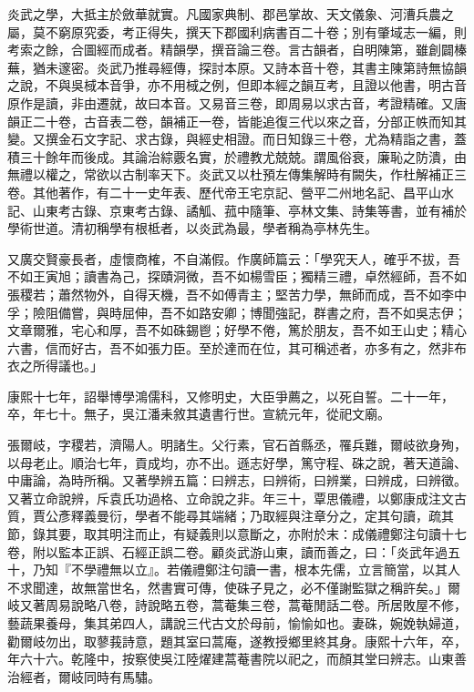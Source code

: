 \begin{pinyinscope}
炎武之學，大抵主於斂華就實。凡國家典制、郡邑掌故、天文儀象、河漕兵農之屬，莫不窮原究委，考正得失，撰天下郡國利病書百二十卷；別有肇域志一編，則考索之餘，合圖經而成者。精韻學，撰音論三卷。言古韻者，自明陳第，雖創闢榛蕪，猶未邃密。炎武乃推尋經傳，探討本原。又詩本音十卷，其書主陳第詩無協韻之說，不與吳棫本音爭，亦不用棫之例，但即本經之韻互考，且證以他書，明古音原作是讀，非由遷就，故曰本音。又易音三卷，即周易以求古音，考證精確。又唐韻正二十卷，古音表二卷，韻補正一卷，皆能追復三代以來之音，分部正帙而知其變。又撰金石文字記、求古錄，與經史相證。而日知錄三十卷，尤為精詣之書，蓋積三十餘年而後成。其論治綜覈名實，於禮教尤兢兢。謂風俗衰，廉恥之防潰，由無禮以權之，常欲以古制率天下。炎武又以杜預左傳集解時有闕失，作杜解補正三卷。其他著作，有二十一史年表、歷代帝王宅京記、營平二州地名記、昌平山水記、山東考古錄、京東考古錄、譎觚、菰中隨筆、亭林文集、詩集等書，並有補於學術世道。清初稱學有根柢者，以炎武為最，學者稱為亭林先生。

又廣交賢豪長者，虛懷商榷，不自滿假。作廣師篇云：「學究天人，確乎不拔，吾不如王寅旭；讀書為己，探賾洞微，吾不如楊雪臣；獨精三禮，卓然經師，吾不如張稷若；蕭然物外，自得天機，吾不如傅青主；堅苦力學，無師而成，吾不如李中孚；險阻備嘗，與時屈伸，吾不如路安卿；博聞強記，群書之府，吾不如吳志伊；文章爾雅，宅心和厚，吾不如硃錫鬯；好學不倦，篤於朋友，吾不如王山史；精心六書，信而好古，吾不如張力臣。至於達而在位，其可稱述者，亦多有之，然非布衣之所得議也。」

康熙十七年，詔舉博學鴻儒科，又修明史，大臣爭薦之，以死自誓。二十一年，卒，年七十。無子，吳江潘耒敘其遺書行世。宣統元年，從祀文廟。

張爾岐，字稷若，濟陽人。明諸生。父行素，官石首縣丞，罹兵難，爾岐欲身殉，以母老止。順治七年，貢成均，亦不出。遜志好學，篤守程、硃之說，著天道論、中庸論，為時所稱。又著學辨五篇：曰辨志，曰辨術，曰辨業，曰辨成，曰辨徵。又著立命說辨，斥袁氏功過格、立命說之非。年三十，覃思儀禮，以鄭康成注文古質，賈公彥釋義曼衍，學者不能尋其端緒；乃取經與注章分之，定其句讀，疏其節，錄其要，取其明注而止，有疑義則以意斷之，亦附於末：成儀禮鄭注句讀十七卷，附以監本正誤、石經正誤二卷。顧炎武游山東，讀而善之，曰：「炎武年過五十，乃知『不學禮無以立』。若儀禮鄭注句讀一書，根本先儒，立言簡當，以其人不求聞達，故無當世名，然書實可傳，使硃子見之，必不僅謝監獄之稱許矣。」爾岐又著周易說略八卷，詩說略五卷，蒿菴集三卷，蒿菴閒話二卷。所居敗屋不修，藝蔬果養母，集其弟四人，講說三代古文於母前，愉愉如也。妻硃，婉娩執婦道，勸爾岐勿出，取蓼莪詩意，題其室曰蒿庵，遂教授鄉里終其身。康熙十六年，卒，年六十六。乾隆中，按察使吳江陸燿建蒿菴書院以祀之，而顏其堂曰辨志。山東善治經者，爾岐同時有馬驌。


\end{pinyinscope}
